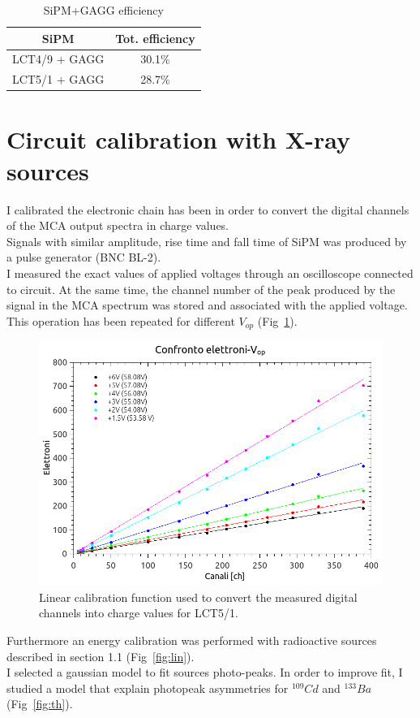 \documentclass[10pt,a4paper, openany]{book}
\begin{document}
\begin{table}[h]
\begin{tabular}{cc}
\toprule
SiPM & Tot. efficiency \\
\midrule
LCT4/9 + GAGG& 30.1\% \\
LCT5/1 + GAGG& 28.7\% \\
\bottomrule
\end{tabular}
\caption{SiPM+GAGG efficiency}
\label{tab:eff}
\end{table}

\section{Circuit calibration with X-ray sources}
I calibrated the electronic chain has been in order to convert the digital channels of the MCA output spectra in charge values.\\
Signals with similar amplitude, rise time and fall time of SiPM was produced by a pulse generator (BNC BL-2).\\
I measured the exact values of applied voltages through an oscilloscope connected to circuit. At the same time, the channel number of the peak produced by the signal in the MCA spectrum was stored and associated with the applied voltage.\\
This operation has been repeated for different $V_{op}$ (Fig~\ref{fig:lin1}).

\begin{figure}[!h]
\begin{center}
\includegraphics[scale=0.4]{imm/confronto_tot.png}
\end{center}
\caption{Linear calibration function used to convert the measured digital channels into charge values for LCT5/1.}
\label{fig:lin1}
\end{figure}
Furthermore an energy calibration was performed with radioactive sources described in section 1.1 (Fig~\ref{fig:lin}).\\
I selected a gaussian model to fit sources photo-peaks.
In order to improve fit, I studied a model that explain photopeak asymmetries for $^{109}Cd$ and $^{133}Ba$ (Fig~\ref{fig:th}).
\end{document}
